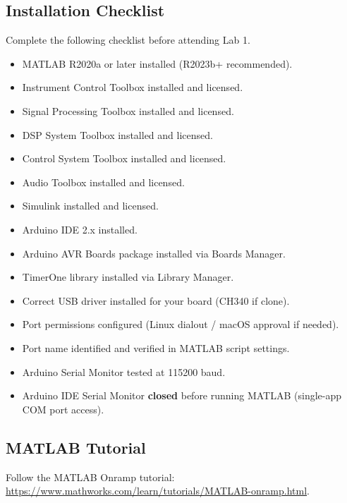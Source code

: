 \documentclass[12pt]{article}
\begin{document}
\subsection{Installation Checklist}
Complete the following checklist before attending Lab 1.
\begin{itemize}
    \item[$\square$] MATLAB R2020a or later installed (R2023b+ recommended).
    \item[$\square$] Instrument Control Toolbox installed and licensed.
    \item[$\square$] Signal Processing Toolbox installed and licensed.
    \item[$\square$] DSP System Toolbox installed and licensed.
    \item[$\square$] Control System Toolbox installed and licensed.
    \item[$\square$] Audio Toolbox installed and licensed.
    \item[$\square$] Simulink installed and licensed.
    \item[$\square$] Arduino IDE 2.x installed.
    \item[$\square$] Arduino AVR Boards package installed via Boards Manager.
    \item[$\square$] TimerOne library installed via Library Manager.
    \item[$\square$] Correct USB driver installed for your board (CH340 if clone).
    \item[$\square$] Port permissions configured (Linux dialout / macOS approval if needed).
    \item[$\square$] Port name identified and verified in MATLAB script settings.
    \item[$\square$] Arduino Serial Monitor tested at 115200 baud.
    \item[$\square$] Arduino IDE Serial Monitor \textbf{closed} before running MATLAB (single-app COM port access).
\end{itemize}



\subsection{MATLAB Tutorial}
Follow the MATLAB Onramp tutorial: \url{https://www.mathworks.com/learn/tutorials/MATLAB-onramp.html}. 
\end{document}
